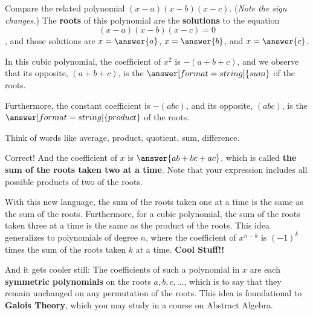 \documentclass{ximera}
\begin{document}
\begin{problem}
Compare the related polynomial $(x-a)(x-b)(x-c)$.  (\emph{Note the sign changes.}) The \textbf{roots} of this polynomial are the \textbf{solutions} to the 
equation 
\[
(x-a)(x-b)(x-c)=0
\]
, and those solutions are $x=\answer{a}$, $x=\answer{b}$, and $x=\answer{c}$.  

\begin{problem}
In this cubic polynomial, the coefficient of $x^2$ is $-(a+b+c)$, and we observe that its opposite, $(a+b+c)$, is the $\answer[format=string]{sum}$ of the roots.  

Furthermore, the constant coefficient is $-(abc)$, and its opposite, $(abc)$, is the $\answer[format=string]{product}$ of the roots.  
\begin{hint}
Think of words like average, product, quotient, sum, difference. 
\end{hint}

\begin{problem}
Correct!  And the coefficient of $x$ is $\answer{ab+bc+ac}$, which is called \textbf{the sum of the roots taken two at a time}.  Note that your expression includes all possible products of two of the roots.  

With this new language, the sum of the roots taken one at a time is the same as the sum of the roots.  Furthermore, for a cubic polynomial, the sum of the roots taken three at a time is the same as the product of the roots.  This idea generalizes to polynomials of degree $n$, where the coefficient of $x^{n-k}$ is $(-1)^k$ times the sum of the roots taken $k$ at a time.  \textbf{Cool Stuff!!}

And it gets cooler still:  The coefficients of such a polynomial in $x$ are each \textbf{symmetric polynomials} on the roots $a, b, c, \dots$, which is to say that they remain unchanged on any permutation of the roots.  This idea is foundational to \textbf{Galois Theory}, which you may study in a course on Abstract Algebra.  
\end{problem}
\end{problem}
\end{problem}



\end{document}
